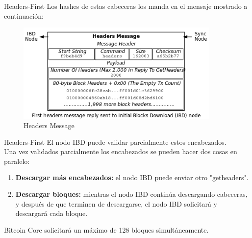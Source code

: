 \documentclass[compress,brown,xcolor=table]{beamer}
\begin{document}
\begin{frame}{Headers-First}
Los hashes de estas cabeceras los manda en el mensaje mostrado a continuación:\\
\begin{figure}[h]
	\includegraphics[width=10cm]{../images/Image3.png}
	\centering		
	\caption{Headers Message}
	\label{p5}
\end{figure}
\end{frame}

\begin{frame}{Headers-First}
El nodo IBD puede validar parcialmente estos encabezados.\\

Una vez validados parcialmente los encabezados se pueden hacer dos cosas en paralelo:

\begin{enumerate}
	\item \textbf{Descargar más encabezados:} el nodo IBD puede enviar otro "getheaders".\\

	\item \textbf{Descargar bloques:} mientras el nodo IBD continúa descargando cabeceras, y después de que terminen de descargarse, el nodo IBD solicitará y descargará cada bloque.
\end{enumerate}

Bitcoin Core solicitará un máximo de 128 bloques simultáneamente.
\end{frame}
\end{document}

